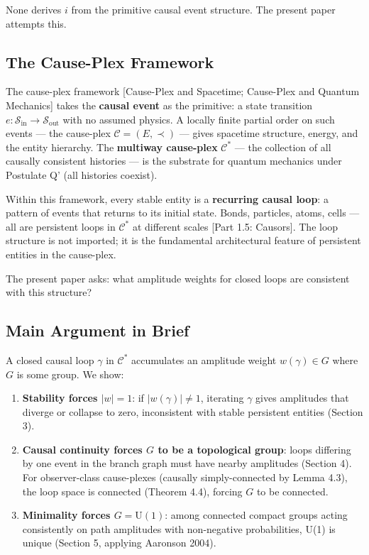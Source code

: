\documentclass[11pt]{article}
\theoremstyle{definition}
\theoremstyle{remark}
\begin{document}
None derives \(i\) from the primitive causal event structure. The
present paper attempts this.

\subsection{The Cause-Plex Framework}\label{the-cause-plex-framework}

The cause-plex framework {[}Cause-Plex and Spacetime; Cause-Plex and
Quantum Mechanics{]} takes the \textbf{causal event} as the primitive: a
state transition
\(e: \mathcal{S}_{\mathrm{in}} \to \mathcal{S}_{\mathrm{out}}\) with no
assumed physics. A locally finite partial order on such events --- the
cause-plex \(\mathcal{C} = (E, \prec)\) --- gives spacetime structure,
energy, and the entity hierarchy. The \textbf{multiway cause-plex}
\(\mathcal{C}^{\ast}\) --- the collection of all causally consistent
histories --- is the substrate for quantum mechanics under Postulate Q'
(all histories coexist).

Within this framework, every stable entity is a \textbf{recurring causal
loop}: a pattern of events that returns to its initial state. Bonds,
particles, atoms, cells --- all are persistent loops in
\(\mathcal{C}^{\ast}\) at different scales {[}Part 1.5: Causors{]}. The
loop structure is not imported; it is the fundamental architectural
feature of persistent entities in the cause-plex.

The present paper asks: what amplitude weights for closed loops are
consistent with this structure?

\subsection{Main Argument in Brief}\label{main-argument-in-brief}

A closed causal loop \(\gamma\) in \(\mathcal{C}^{\ast}\) accumulates an
amplitude weight \(w(\gamma) \in G\) where \(G\) is some group. We show:

\begin{enumerate}
\def\labelenumi{\arabic{enumi}.}
\item
  \textbf{Stability forces \(|w| = 1\)}: if \(|w(\gamma)| \neq 1\),
  iterating \(\gamma\) gives amplitudes that diverge or collapse to
  zero, inconsistent with stable persistent entities (Section 3).
\item
  \textbf{Causal continuity forces \(G\) to be a topological group}:
  loops differing by one event in the branch graph must have nearby
  amplitudes (Section 4). For observer-class cause-plexes (causally
  simply-connected by Lemma 4.3), the loop space is connected (Theorem
  4.4), forcing \(G\) to be connected.
\item
  \textbf{Minimality forces \(G = \mathrm{U}(1)\)}: among connected
  compact groups acting consistently on path amplitudes with
  non-negative probabilities, U(1) is unique (Section 5, applying
  Aaronson 2004).
\end{enumerate}
\end{document}
